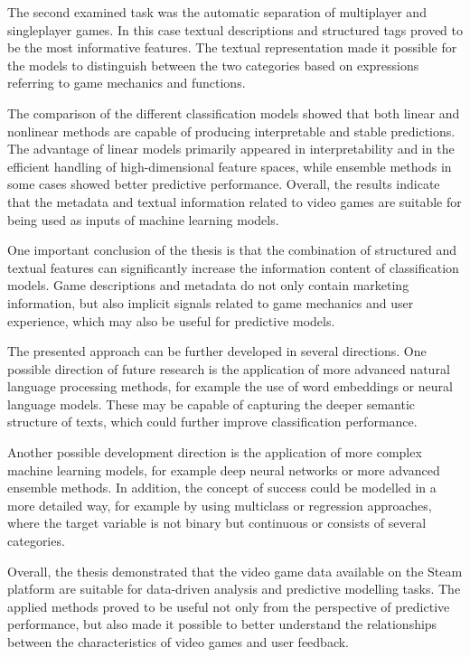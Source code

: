 The second examined task was the automatic separation of multiplayer and singleplayer games.
In this case textual descriptions and structured tags proved to be the most informative features.
The textual representation made it possible for the models
to distinguish between the two categories
based on expressions referring to game mechanics and functions.

The comparison of the different classification models showed
that both linear and nonlinear methods are capable of producing interpretable and stable predictions.
The advantage of linear models primarily appeared in interpretability
and in the efficient handling of high-dimensional feature spaces,
while ensemble methods in some cases showed better predictive performance.
Overall, the results indicate that the metadata
and textual information related to video games
are suitable for being used as inputs of machine learning models.

One important conclusion of the thesis is
that the combination of structured and textual features
can significantly increase the information content of classification models.
Game descriptions and metadata do not only contain marketing information,
but also implicit signals related to game mechanics and user experience,
which may also be useful for predictive models.

The presented approach can be further developed in several directions.
One possible direction of future research is the application
of more advanced natural language processing methods,
for example the use of word embeddings or neural language models.
These may be capable of capturing the deeper semantic structure of texts,
which could further improve classification performance.

Another possible development direction is the application
of more complex machine learning models,
for example deep neural networks or more advanced ensemble methods.
In addition, the concept of success could be modelled in a more detailed way,
for example by using multiclass or regression approaches,
where the target variable is not binary
but continuous or consists of several categories.

Overall, the thesis demonstrated
that the video game data available on the Steam platform
are suitable for data-driven analysis and predictive modelling tasks.
The applied methods proved to be useful not only from the perspective of predictive performance,
but also made it possible to better understand the relationships
between the characteristics of video games
and user feedback.